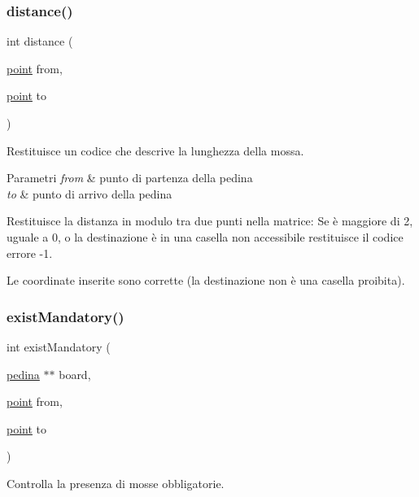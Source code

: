\subsubsection{\texorpdfstring{distance()}{distance()}}
{\footnotesize\ttfamily int distance (\begin{DoxyParamCaption}\item[{\hyperlink{structpunto}{point}}]{from,  }\item[{\hyperlink{structpunto}{point}}]{to }\end{DoxyParamCaption})}



Restituisce un codice che descrive la lunghezza della mossa. 


\begin{DoxyParams}{Parametri}
{\em from} & punto di partenza della pedina \\
\hline
{\em to} & punto di arrivo della pedina\\
\hline
\end{DoxyParams}
Restituisce la distanza in modulo tra due punti nella matrice\+: Se è maggiore di 2, uguale a 0, o la destinazione è in una casella non accessibile restituisce il codice errore -\/1.

Le coordinate inserite sono corrette (la destinazione non è una casella proibita). \mbox{\label{group__Logiche_gaf5deae59415fab0cf7de74362d4b56e6}} 
\subsubsection{\texorpdfstring{exist\+Mandatory()}{existMandatory()}}
{\footnotesize\ttfamily int exist\+Mandatory (\begin{DoxyParamCaption}\item[{\hyperlink{ml__lib_8h_a71fee95122b31f5cb0b07d9c16ffa3a5}{pedina} $\ast$$\ast$}]{board,  }\item[{\hyperlink{structpunto}{point}}]{from,  }\item[{\hyperlink{structpunto}{point}}]{to }\end{DoxyParamCaption})}



Controlla la presenza di mosse obbligatorie. 


